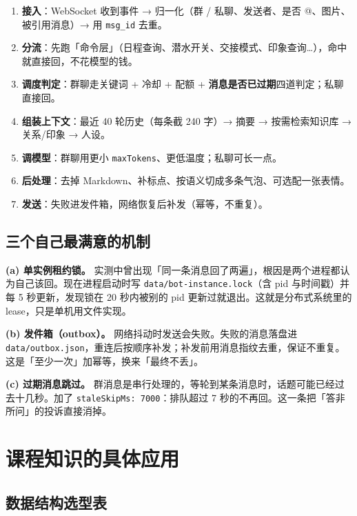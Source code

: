 \documentclass[11pt,a4paper]{ctexart}
\begin{document}
\begin{enumerate}[leftmargin=1.6em]
\item \textbf{接入}：WebSocket 收到事件 → 归一化（群 / 私聊、发送者、是否 @、图片、被引用消息）→ 用 \texttt{msg\_id} 去重。
\item \textbf{分流}：先跑「命令层」（日程查询、潜水开关、交接模式、印象查询…），命中就直接回，不花模型的钱。
\item \textbf{调度判定}：群聊走关键词 + 冷却 + 配额 + \textbf{消息是否已过期}四道判定；私聊直接回。
\item \textbf{组装上下文}：最近 40 轮历史（每条截 240 字）→ 摘要 → 按需检索知识库 → 关系/印象 → 人设。
\item \textbf{调模型}：群聊用更小 \texttt{maxTokens}、更低温度；私聊可长一点。
\item \textbf{后处理}：去掉 Markdown、补标点、按语义切成多条气泡、可选配一张表情。
\item \textbf{发送}：失败进发件箱，网络恢复后补发（幂等，不重复）。
\end{enumerate}

\subsection{三个自己最满意的机制}

\textbf{(a) 单实例租约锁。} 实测中曾出现「同一条消息回了两遍」，根因是两个进程都认为自己该回。现在进程启动时写 \texttt{data/bot-instance.lock}（含 pid 与时间戳）并每 5 秒更新，发现锁在 20 秒内被别的 pid 更新过就退出。这就是分布式系统里的 lease，只是单机用文件实现。

\textbf{(b) 发件箱（outbox）。} 网络抖动时发送会失败。失败的消息落盘进 \texttt{data/outbox.json}，重连后按顺序补发；补发前用消息指纹去重，保证不重复。这是「至少一次」加幂等，换来「最终不丢」。

\textbf{(c) 过期消息跳过。} 群消息是串行处理的，等轮到某条消息时，话题可能已经过去十几秒。加了 \texttt{staleSkipMs: 7000}：排队超过 7 秒的不再回。这一条把「答非所问」的投诉直接消掉。

\section{课程知识的具体应用}

\subsection{数据结构选型表}
\end{document}
